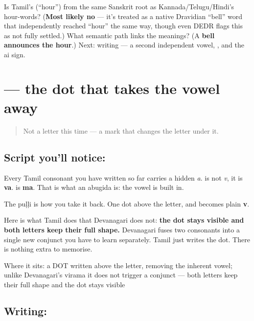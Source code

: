 \begin{tcolorbox}[breakable,colback=teal!4,colframe=teal!35!black,title={Before you move on}]
Is Tamil's \textbf{} (\textquotedblleft{}hour\textquotedblright{}) from the same Sanskrit root as Kannada/Telugu/Hindi's hour-words? (\textbf{Most likely no} — it's treated as a native Dravidian \textquotedblleft{}bell\textquotedblright{} word that independently reached \textquotedblleft{}hour\textquotedblright{} the same way, though even DEDR flags this as not fully settled.) What semantic path links the meanings? (A \textbf{bell announces the hour}.) Next: writing  — a second independent vowel, , and the ai sign.
\end{tcolorbox}
\section[\texorpdfstring{\ta{்} (puḷḷi)}{் (puḷḷi)}]{ — the dot that takes the vowel away}

\label{lesson:TA-S08-pulli}



\begin{quote}
Not a letter this time — a mark that changes the letter under it.
\end{quote}

\subsection*{Script you'll notice: }
Every Tamil consonant you have written so far carries a hidden \emph{a}.  is not \emph{v}, it is \textbf{va}.  is \textbf{ma}. That is what an abugida is: the vowel is built in.

The puḷḷi is how you take it back. One dot above the letter, and  becomes plain \textbf{v}.

Here is what Tamil does that Devanagari does not: \textbf{the dot stays visible and both letters keep their full shape.} Devanagari fuses two consonants into a single new conjunct you have to learn separately. Tamil just writes the dot. There is nothing extra to memorise.

Where it sits: a DOT written above the letter, removing the inherent vowel; unlike Devanagari's virama it does not trigger a conjunct — both letters keep their full shape and the dot stays visible

\subsection*{Writing: }

